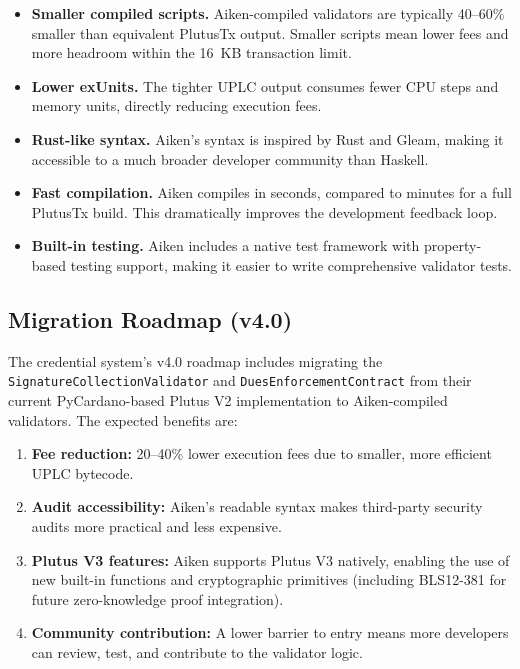 \begin{itemize}[nosep]
  \item \textbf{Smaller compiled scripts.} Aiken-compiled validators
    are typically 40--60\% smaller than equivalent PlutusTx output.
    Smaller scripts mean lower fees and more headroom within the 16~KB
    transaction limit.
  \item \textbf{Lower exUnits.} The tighter UPLC output consumes fewer
    CPU steps and memory units, directly reducing execution fees.
  \item \textbf{Rust-like syntax.} Aiken's syntax is inspired by Rust
    and Gleam, making it accessible to a much broader developer
    community than Haskell.
  \item \textbf{Fast compilation.} Aiken compiles in seconds, compared
    to minutes for a full PlutusTx build. This dramatically improves
    the development feedback loop.
  \item \textbf{Built-in testing.} Aiken includes a native test
    framework with property-based testing support, making it easier to
    write comprehensive validator tests.
\end{itemize}

\subsection{Migration Roadmap (v4.0)}

The credential system's v4.0 roadmap includes migrating the
\texttt{SignatureCollectionValidator} and \texttt{DuesEnforcementContract}
from their current PyCardano-based Plutus V2 implementation to
Aiken-compiled validators. The expected benefits are:

\begin{enumerate}[nosep]
  \item \textbf{Fee reduction:} 20--40\% lower execution fees due to
    smaller, more efficient UPLC bytecode.
  \item \textbf{Audit accessibility:} Aiken's readable syntax makes
    third-party security audits more practical and less expensive.
  \item \textbf{Plutus V3 features:} Aiken supports Plutus V3 natively,
    enabling the use of new built-in functions and cryptographic
    primitives (including BLS12-381 for future zero-knowledge proof
    integration).
  \item \textbf{Community contribution:} A lower barrier to entry means
    more developers can review, test, and contribute to the validator
    logic.
\end{enumerate}

